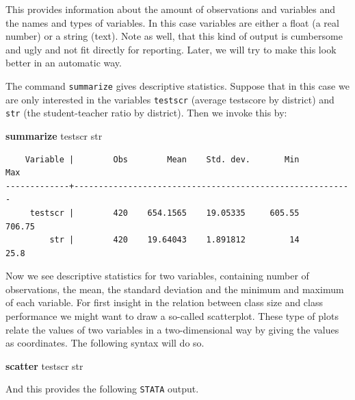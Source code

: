 \documentclass[
]{book}
\newenvironment{Shaded}{\begin{snugshade}}{\end{snugshade}}
\newcommand{\KeywordTok}[1]{\textcolor[rgb]{0.13,0.29,0.53}{\textbf{#1}}}
\newcommand{\NormalTok}[1]{#1}
\begin{document}
This provides information about the amount of observations and variables and the names and types of variables. In this case variables are either a float (a real number) or a string (text). Note as well, that this kind of output is cumbersome and ugly and not fit directly for reporting. Later, we will try to make this look better in an automatic way.

The command \texttt{summarize} gives descriptive statistics. Suppose that in this case we are only interested in the variables \texttt{testscr} (average testscore by district) and \texttt{str} (the student-teacher ratio by district). Then we invoke this by:

\begin{Shaded}
\begin{Highlighting}[]
\KeywordTok{summarize}\NormalTok{ testscr str}
\end{Highlighting}
\end{Shaded}

\begin{verbatim}
    Variable |        Obs        Mean    Std. dev.       Min        Max
-------------+---------------------------------------------------------
     testscr |        420    654.1565    19.05335     605.55     706.75
         str |        420    19.64043    1.891812         14       25.8
\end{verbatim}

Now we see descriptive statistics for two variables, containing number of observations, the mean, the standard deviation and the minimum and maximum of each variable. For first insight in the relation between class size and class performance we might want to draw a so-called scatterplot. These type of plots relate the values of two variables in a two-dimensional way by giving the values as coordinates. The following syntax will do so.

\begin{Shaded}
\begin{Highlighting}[]
\KeywordTok{scatter}\NormalTok{ testscr str}
\end{Highlighting}
\end{Shaded}

And this provides the following \texttt{STATA} output.
\end{document}
